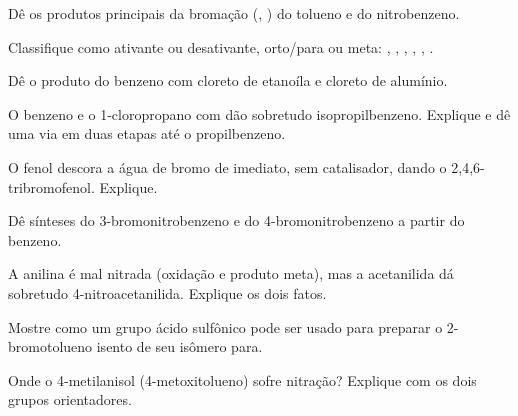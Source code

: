 \begin{exercise}[$\star$]\label{exo:b2:aromatic-substitution:2}
Dê os produtos principais da bromação (, ) do tolueno e do
nitrobenzeno.
\end{exercise}

\begin{exercise}[$\star$]\label{exo:b2:aromatic-substitution:3}
Classifique como ativante ou desativante, orto/para ou meta: , , ,
, , .
\end{exercise}

\begin{exercise}[$\star$]\label{exo:b2:aromatic-substitution:4}
Dê o produto do benzeno com cloreto de etanoíla e cloreto de alumínio.
\end{exercise}

\begin{exercise}[$\star\star$]\label{exo:b2:aromatic-substitution:5}
O benzeno e o 1-cloropropano com  dão sobretudo isopropilbenzeno.
Explique e dê uma via em duas etapas até o propilbenzeno.
\end{exercise}

\begin{exercise}[$\star\star$]\label{exo:b2:aromatic-substitution:6}
O fenol descora a água de bromo de imediato, sem catalisador, dando o
2,4,6-tribromofenol. Explique.
\end{exercise}

\begin{exercise}[$\star\star$]\label{exo:b2:aromatic-substitution:7}
Dê sínteses do 3-bromonitrobenzeno e do 4-bromonitrobenzeno a partir do benzeno.
\end{exercise}

\begin{exercise}[$\star\star$]\label{exo:b2:aromatic-substitution:8}
A anilina é mal nitrada (oxidação e produto meta), mas a acetanilida dá
sobretudo 4-nitroacetanilida. Explique os dois fatos.
\end{exercise}

\begin{exercise}[$\star\star$]\label{exo:b2:aromatic-substitution:9}
Mostre como um grupo ácido sulfônico pode ser usado para preparar o 2-bromotolueno isento de seu isômero para.
\end{exercise}

\begin{exercise}[$\star\star\star$]\label{exo:b2:aromatic-substitution:10}
Onde o 4-metilanisol (4-metoxitolueno) sofre nitração? Explique com os dois
grupos orientadores.
\end{exercise}

